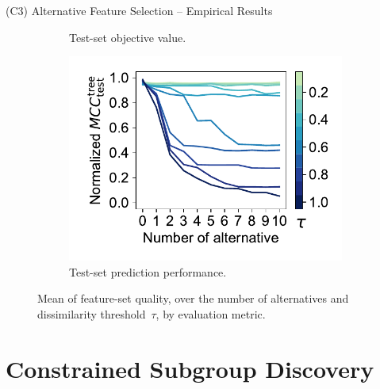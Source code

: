 \documentclass[en, navbarinline, handout]{sdqbeamer}
\begin{document}
\begin{frame}[t]{(C3) Alternative Feature Selection -- Empirical Results}
\begin{figure}
\begin{subfigure}[t]{0.32\textwidth}
			\caption{Test-set objective value.}
		\end{subfigure}
		\hfill
		\begin{subfigure}[t]{0.32\textwidth}
			\centering
			\includegraphics[width=\textwidth, trim={15 15 10 15}, clip]{plots/afs-impact-num-alternatives-tau-decision-tree-test-mcc-max-fillna.pdf}
			\caption{Test-set prediction performance.}
		\end{subfigure}
		\caption*{
			Mean of feature-set quality, over the number of alternatives and dissimilarity threshold~$\tau$, by evaluation metric.
		}
	\end{figure}
\end{frame}

\section{Constrained Subgroup Discovery}
\end{document}
